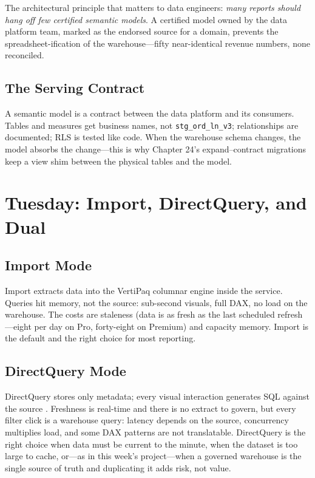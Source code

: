 The architectural principle that matters to data engineers: \emph{many reports should hang off few certified semantic models}. A certified model owned by the data platform team, marked as the endorsed source for a domain, prevents the spreadsheet-ification of the warehouse---fifty near-identical revenue numbers, none reconciled.

\subsection{The Serving Contract}
A semantic model is a contract between the data platform and its consumers. Tables and measures get business names, not \texttt{stg\_ord\_ln\_v3}; relationships are documented; RLS is tested like code. When the warehouse schema changes, the model absorbs the change---this is why Chapter 24's expand--contract migrations keep a view shim between the physical tables and the model.

\section{Tuesday: Import, DirectQuery, and Dual}

\subsection{Import Mode}
Import extracts data into the VertiPaq columnar engine inside the service. Queries hit memory, not the source: sub-second visuals, full DAX, no load on the warehouse. The costs are staleness (data is as fresh as the last scheduled refresh---eight per day on Pro, forty-eight on Premium) and capacity memory. Import is the default and the right choice for most reporting.

\subsection{DirectQuery Mode}
DirectQuery stores only metadata; every visual interaction generates SQL against the source \cite{microsoft2025directquery}. Freshness is real-time and there is no extract to govern, but every filter click is a warehouse query: latency depends on the source, concurrency multiplies load, and some DAX patterns are not translatable. DirectQuery is the right choice when data must be current to the minute, when the dataset is too large to cache, or---as in this week's project---when a governed warehouse is the single source of truth and duplicating it adds risk, not value.

